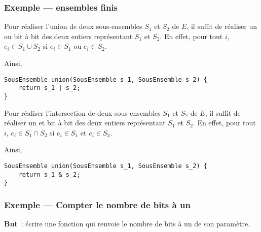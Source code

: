 \begin{frame}[fragile] \frametitle{Exemple --- ensembles finis}
Pour réaliser l'union de deux sous-ensembles $S_1$ et $S_2$ de $E$,
il suffit de réaliser un ou bit à bit des deux entiers représentant
$S_1$ et $S_2$. En effet, pour tout $i$, $e_i \in S_1 \cup S_2$ si
$e_i \in S_1$ ou $e_i \in S_2$.
\medskip

Ainsi,
\begin{lstlisting}
SousEnsemble union(SousEnsemble s_1, SousEnsemble s_2) {
    return s_1 | s_2;
}
\end{lstlisting}
\bigskip

Pour réaliser l'intersection de deux sous-ensembles $S_1$ et $S_2$ de $E$,
il suffit de réaliser un et bit à bit des deux entiers représentant
$S_1$ et $S_2$. En effet, pour tout $i$, $e_i \in S_1 \cap S_2$ si
$e_i \in S_1$ et $e_i \in S_2$.
\medskip

Ainsi,
\begin{lstlisting}
SousEnsemble union(SousEnsemble s_1, SousEnsemble s_2) {
    return s_1 & s_2;
}
\end{lstlisting}
\end{frame}

\begin{frame}[fragile]
\frametitle{Exemple --- Compter le nombre de bits à un}
{\bf But}~: écrire une fonction qui renvoie le nombre de bits à un
de son paramètre.
\bigskip

\begin{semiverbatim}\small{}
\end{semiverbatim}
\bigskip
\bigskip

\begin{semiverbatim}\small
{}
\end{semiverbatim}
\end{frame}


